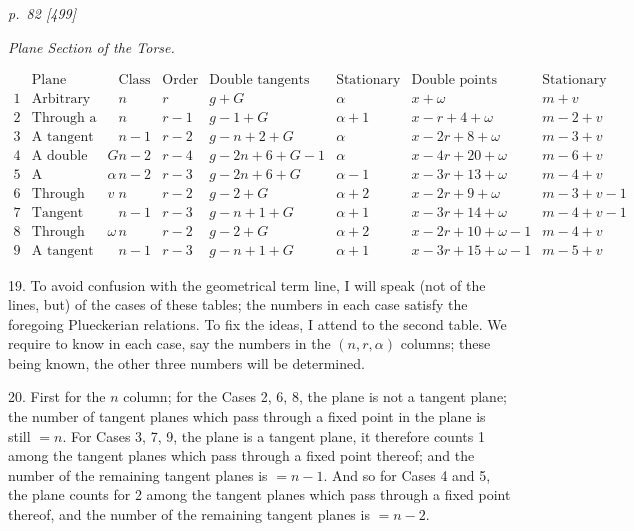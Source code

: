 \documentclass[11pt,a4paper]{article}
\newcommand{\pagemarker}[2]{\clearpage\noindent\textit{p.~#1 [#2]}\par\medskip}
\begin{document}
\pagemarker{82}{499}
\begin{center}\textit{Plane Section of the Torse.}\end{center}
\tiny
\[
\begin{array}{c|l|c|c|c|c|c|c}
&\text{Plane}&\text{Class}&\text{Order}&\text{Double tangents}
&\text{Stationary tangents}&\text{Double points}&\text{Stationary points}\\ \hline
1&\text{Arbitrary}&n&r&g+G&\alpha&x+\omega&m+v\\
2&\text{Through a tangent}&n&r-1&g-1+G&\alpha+1&x-r+4+\omega&m-2+v\\
3&\text{A tangent plane}&n-1&r-2&g-n+2+G&\alpha&x-2r+8+\omega&m-3+v\\
4&\text{A double tangent plane }G&n-2&r-4&g-2n+6+G-1&\alpha&x-4r+20+\omega&m-6+v\\
5&\text{A stationary tangent plane }\alpha&n-2&r-3&g-2n+6+G&\alpha-1&x-3r+13+\omega&m-4+v\\
6&\text{Through stationary tangent }v&n&r-2&g-2+G&\alpha+2&x-2r+9+\omega&m-3+v-1\\
7&\text{Tangent plane at contact of ditto}&n-1&r-3&g-n+1+G&\alpha+1&x-3r+14+\omega&m-4+v-1\\
8&\text{Through double tangent }\omega&n&r-2&g-2+G&\alpha+2&x-2r+10+\omega-1&m-4+v\\
9&\text{A tangent plane at one contact of ditto}&n-1&r-3&g-n+1+G&\alpha+1&x-3r+15+\omega-1&m-5+v
\end{array}
\]
\normalsize

19. To avoid confusion with the geometrical term line, I will speak (not of the
lines, but) of the cases of these tables; the numbers in each case satisfy the foregoing
Plueckerian relations. To fix the ideas, I attend to the second table. We require to
know in each case, say the numbers in the \((n,r,\alpha)\) columns; these being known,
the other three numbers will be determined.

20. First for the \(n\) column; for the Cases 2, 6, 8, the plane is not a tangent
plane; the number of tangent planes which pass through a fixed point in the plane is
still \(=n\). For Cases 3, 7, 9, the plane is a tangent plane, it therefore counts 1
among the tangent planes which pass through a fixed point thereof; and the number
of the remaining tangent planes is \(=n-1\). And so for Cases 4 and 5, the plane
counts for 2 among the tangent planes which pass through a fixed point thereof, and
the number of the remaining tangent planes is \(=n-2\).
\end{document}
